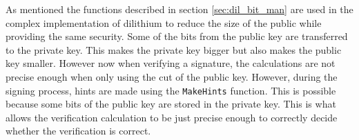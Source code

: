 As mentioned the functions described in section \ref{sec:dil_bit_man} are used in the complex implementation of dilithium to reduce the size of the public while providing the same security. Some of the bits from the public key are transferred to the private key. This makes the private key bigger but also makes the public key smaller. However now when verifying a signature, the calculations are not precise enough when only using the cut of the public key. However, during the signing process, hints are made using the \texttt{MakeHints} function. This is possible because some bits of the public key are stored in the private key. This is what allows the verification calculation to be just precise enough to correctly decide whether the verification is correct. \cite{y0VQZiTmHEg2xvPn}
